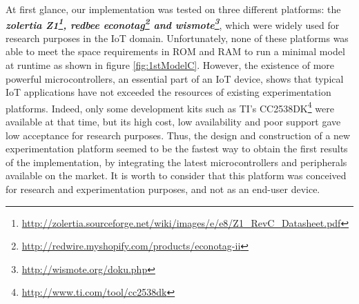 At first glance, our implementation was tested on three different platforms: the \textit{\textbf{zolertia Z1\footnote{\url{http://zolertia.sourceforge.net/wiki/images/e/e8/Z1_RevC_Datasheet.pdf}}, redbee econotag\footnote{\url{http://redwire.myshopify.com/products/econotag-ii}} and wismote\footnote{\url{http://wismote.org/doku.php}}}}, which were widely used for research purposes in the IoT domain.
Unfortunately, none of these platforms was able to meet the space requirements in ROM and RAM to run a minimal model at runtime as shown in figure \ref{fig:1stModelC}.
However, the existence of more powerful microcontrollers, an essential part of an IoT device, shows that typical IoT applications have not exceeded the resources of existing experimentation platforms.
Indeed, only some development kits such as TI's CC2538DK\footnote{\url{http://www.ti.com/tool/cc2538dk}} were available at that time, but its high cost, low availability and poor support gave low acceptance for research purposes.
Thus, the design and construction of a new experimentation platform seemed to be the fastest way to obtain the first results of the implementation, by integrating the latest microcontrollers and peripherals available on the market.
It is worth to consider that this platform was conceived for research and experimentation purposes, and not as an end-user device.

